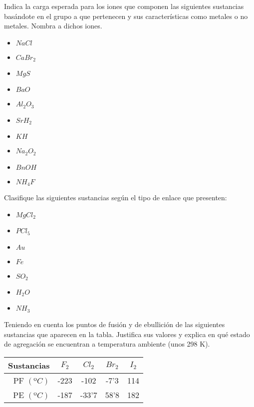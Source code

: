 \begin{prob}
Indica la carga esperada para los iones que componen las siguientes sustancias basándote en el grupo
a que pertenecen y sus características como metales o no metales. Nombra a dichos iones.
\begin{multicols}{3}
\begin{itemize}
\item $NaCl$
\item $CaBr_2$
\item $MgS$
\item $BaO$
\item $Al_2O_3$
\item $SrH_2$
\item $KH$
\item $Na_2O_2$
\item $BnOH$
\item $NH_4F$
\end{itemize}
\end{multicols}
\end{prob}


\begin{prob}
Clasifique las siguientes sustancias según el tipo de enlace que presenten:
\begin{multicols}{3}
\begin{itemize}
\item $MgCl_2$
\item $PCl_5$
\item $Au$
\item $Fe$
\item $SO_2$
\item $H_2O$
\item $NH_3$
\end{itemize}
\end{multicols}
\end{prob}


\begin{prob}
Teniendo en cuenta los puntos de fusión y de ebullición de las siguientes sustancias que aparecen en la tabla. 
Justifica sus valores y explica en qué estado de agregación se encuentran a temperatura ambiente (unos 298 K).
\vspace{8pt}

\begin{tabular}{|r|c|c|c|c|}
\hline
Sustancias& $F_2$& $Cl_2$& $Br_2$& $I_2$\\
\hline
PF $(ºC)$	&-223	&-102	&-7'3		&114\\
\hline
PE $(ºC)$	&-187	&-33'7	&58'8	&182\\
\hline
\end{tabular}
\end{prob}


